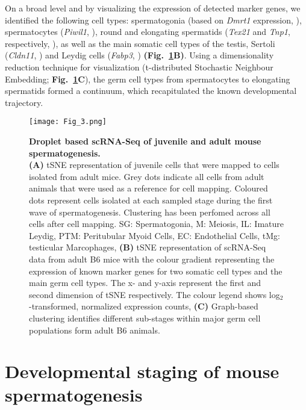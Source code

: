 On a broad level and by visualizing the expression of detected marker genes, we identified the following cell types: spermatogonia (based on \textit{Dmrt1} expression, \citep{Matson2010}), spermatocytes (\textit{Piwil1}, \citep{Deng2002}), round and elongating spermatids (\textit{Tex21} and \textit{Tnp1}, respectively, \citep{Fujii2002}), as well as the main somatic cell types of the testis, Sertoli (\textit{Cldn11}, \citep{Mazaud-Guittot2010}) and Leydig cells (\textit{Fabp3}, \citep{Oresti2013}) \textbf{(Fig.~\ref{fig3:cell_types}B)}. Using a dimensionality reduction technique for visualization (t-distributed Stochastic Neighbour Embedding; \textbf{Fig.~\ref{fig3:cell_types}C}), the germ cell types from spermatocytes to elongating spermatids formed a continuum, which recapitulated the known developmental trajectory.

\newpage

\begin{figure}[!h]
\centering
\texttt{[image: Fig\_3.png]}
\caption[Droplet based scRNA-Seq of juvenile and adult mouse spermatogenesis]{\textbf{Droplet based scRNA-Seq of juvenile and adult mouse spermatogenesis.}\\
\textbf{(A)} tSNE representation of juvenile cells that were mapped to cells isolated from adult mice. Grey dots indicate all cells from adult animals that were used as a reference for cell mapping. Coloured dots represent cells isolated at each sampled stage during the first wave of spermatogenesis. Clustering has been perfomed across all cells after cell mapping. SG: Spermatogonia, M: Meiosis, IL: Imature Leydig, PTM: Peritubular Myoid Cells, EC: Endothelial Cells, tMg: testicular Marcophages, \textbf{(B)} tSNE representation of scRNA-Seq data from adult B6 mice with the colour gradient representing the expression of known marker genes for two somatic cell types and the main germ cell types. The x- and y-axis represent the first and second dimension of tSNE respectively. The colour legend shows log$_2$-transformed, normalized expression counts, \textbf{(C)} Graph-based clustering identifies different sub-stages within major germ cell populations form adult B6 animals. 
}
\label{fig3:cell_types}
\end{figure}

\newpage

\section{Developmental staging of mouse spermatogenesis}
